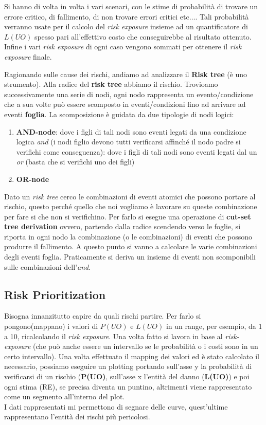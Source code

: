 Si hanno di volta in volta i vari scenari, con le stime di probabilità di trovare un errore critico, di fallimento, di non trovare errori critici etc$\ldots$. Tali probabilità verranno usate per il calcolo del \textit{risk exposure} insieme ad un quantificatore di $L(UO)$ spesso pari all'effettivo costo che conseguirebbe al risultato ottenuto. Infine i vari \textit{risk exposure} di ogni caso vengono sommati per ottenere il \textit{risk exposure} finale.

Ragionando sulle cause dei rischi, andiamo ad analizzare il \textbf{Risk tree} (è uno strumento). Alla radice del \textbf{risk tree} abbiamo il rischio. Trovioamo successivamente una serie di nodi, ogni nodo rappresenta un evento/condizione che a sua volte può essere scomposto in eventi/condizioni fino ad arrivare ad eventi \textbf{foglia}. La scomposizione è guidata da due tipologie di nodi logici:
\begin{enumerate}
    \item \textbf{AND-node}: dove i figli di tali nodi sono eventi legati da una condizione logica \textit{and} (i nodi figlio devono tutti verificarsi affinché il nodo padre si verifichi come conseguenza): dove i figli di tali nodi sono eventi legati dal un \textit{or} (basta che si verifichi uno dei figli)
    \item \textbf{OR-node}
\end{enumerate}

Dato un \textit{risk tree} cerco le combinazioni di eventi atomici che possono portare al rischio, questo perché quello che noi vogliamo è lavorare su queste combinazione per fare si che non si verifichino. Per farlo si esegue una operazione di \textbf{cut-set tree derivation} ovvero, partendo dalla radice scendendo verso le foglie, si riporta in ogni nodo la combinazione (o le combinazioni) di eventi che possono produrre il fallimento. A questo punto si vanno a calcolare le varie combinazioni degli eventi foglia. Praticamente si deriva un insieme di eventi non scomponibili sulle combinazioni dell'\textit{and}.

\subsection{Risk Prioritization}
Bisogna innanzitutto capire da quali rischi partire. Per farlo si pongono(mappano) i valori di $P(UO)$ e $L(UO)$ in un range, per esempio, da 1 a 10, ricalcolando il \textit{risk exposure}. Una volta fatto si lavora in base al \textit{risk-exposure} (che può anche essere un intervallo se le probabilità o i costi sono in un certo intervallo). Una volta effettuato il mapping dei valori ed è stato calcolato il necessario, possiamo eseguire un plotting portando sull'asse y la probabilità di verificarsi di un rischio (\textbf{P(UO)}, sull'asse x l'entità del danno (\textbf{L(UO)}) e poi ogni stima (RE), se precisa diventa un puntino, altrimenti viene rappresentato come un segmento all'interno del plot.  \\
I dati rappresentati mi permettono di segnare delle curve, quest'ultime rappresentano l'entità dei rischi più pericolosi. 

